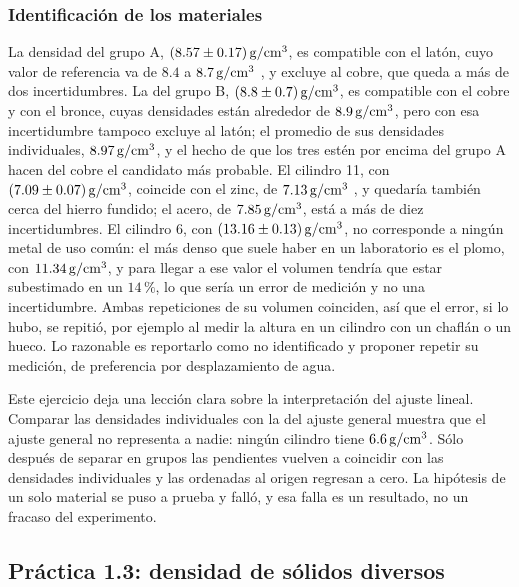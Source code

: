 \subsubsection{Identificación de los materiales}

La densidad del grupo A, $(8.57 \pm 0.17)\,\mathrm{g/cm^{3}}$, es compatible con el latón, cuyo valor de referencia va de $8.4$ a $8.7\,\mathrm{g/cm^{3}}$ \cite{sears, callister}, y excluye al cobre, que queda a más de dos incertidumbres. La del grupo B, $(8.8 \pm 0.7)\,\mathrm{g/cm^{3}}$, es compatible con el cobre y con el bronce, cuyas densidades están alrededor de $8.9\,\mathrm{g/cm^{3}}$, pero con esa incertidumbre tampoco excluye al latón; el promedio de sus densidades individuales, $8.97\,\mathrm{g/cm^{3}}$, y el hecho de que los tres estén por encima del grupo A hacen del cobre el candidato más probable. El cilindro 11, con $(7.09 \pm 0.07)\,\mathrm{g/cm^{3}}$, coincide con el zinc, de $7.13\,\mathrm{g/cm^{3}}$ \cite{callister}, y quedaría también cerca del hierro fundido; el acero, de $7.85\,\mathrm{g/cm^{3}}$, está a más de diez incertidumbres. El cilindro 6, con $(13.16 \pm 0.13)\,\mathrm{g/cm^{3}}$, no corresponde a ningún metal de uso común: el más denso que suele haber en un laboratorio es el plomo, con $11.34\,\mathrm{g/cm^{3}}$, y para llegar a ese valor el volumen tendría que estar subestimado en un $14\,\%$, lo que sería un error de medición y no una incertidumbre. Ambas repeticiones de su volumen coinciden, así que el error, si lo hubo, se repitió, por ejemplo al medir la altura en un cilindro con un chaflán o un hueco. Lo razonable es reportarlo como no identificado y proponer repetir su medición, de preferencia por desplazamiento de agua.

Este ejercicio deja una lección clara sobre la interpretación del ajuste lineal. Comparar las densidades individuales con la del ajuste general muestra que el ajuste general no representa a nadie: ningún cilindro tiene $6.6\,\mathrm{g/cm^{3}}$. Sólo después de separar en grupos las pendientes vuelven a coincidir con las densidades individuales y las ordenadas al origen regresan a cero. La hipótesis de un solo material se puso a prueba y falló, y esa falla es un resultado, no un fracaso del experimento.

\subsection{Práctica 1.3: densidad de sólidos diversos}

